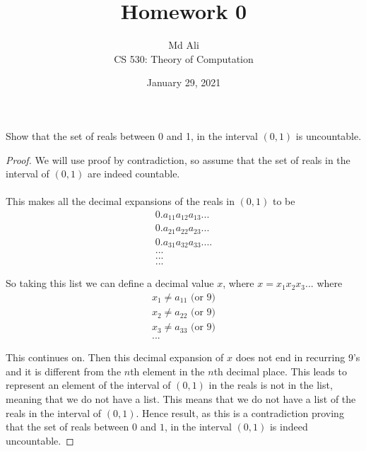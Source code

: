 \documentclass[12pt]{article}
\newenvironment{exercise}[2][Exercise]{\begin{trivlist}
\item[\hskip \labelsep {\bfseries #1}\hskip \labelsep {\bfseries #2.}]}{\end{trivlist}}
\begin{document}
 
\title{Homework 0}
\author{Md Ali \\ 
CS 530: Theory of Computation} 
\date{January 29, 2021}

\maketitle
 
\begin{exercise}{1}
Show that the set of reals between 0 and 1, in the interval $(0,1)$ is uncountable.
\end{exercise} 

\begin{proof}
We will use proof by contradiction, so assume that the set of reals in the interval of $(0,1)$ are indeed countable. \\ \\ 
This makes all the decimal expansions of the reals in $(0,1)$ to be
\begin{align}
    0.a_{11}a_{12}a_{13} ... \nonumber \\
    0.a_{21}a_{22}a_{23} ... \nonumber \\
    0.a_{31}a_{32}a_{33} .... \nonumber \\
    ... \nonumber  \\
    ... \nonumber \\
    ... \nonumber
\end{align}

So taking this list we can define a decimal value $x$, where $x = x_{1}x_{2}x_{3}...$ where 
\begin{align}
    x_{1} \neq a_{11} \text{ (or 9)}\nonumber \\
    x_{2} \neq a_{22} \text{ (or 9)}\nonumber \\
    x_{3} \neq a_{33} \text{ (or 9)}\nonumber \\
    ... \nonumber
\end{align}

This continues on. Then this decimal expansion of $x$ does not end in recurring 9's and it is different from the $n$th element in the $n$th decimal place. This leads to represent an element of the interval of $(0,1)$ in the reals is not in the list, meaning that we do not have a list. This means that we do not have a list of the reals in the interval of $(0,1)$. Hence result, as this is a contradiction proving that the set of reals between $0$ and $1$, in the interval $(0,1)$ is indeed uncountable. 

\end{proof} 
\end{document}
